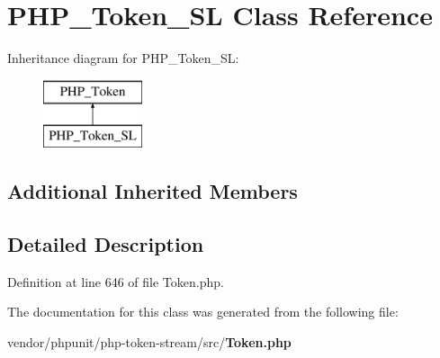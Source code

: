 \section{P\+H\+P\+\_\+\+Token\+\_\+\+S\+L Class Reference}
\label{class_p_h_p___token___s_l}
Inheritance diagram for P\+H\+P\+\_\+\+Token\+\_\+\+S\+L\+:\begin{figure}[H]
\begin{center}
\leavevmode
\includegraphics[height=2.000000cm]{class_p_h_p___token___s_l}
\end{center}
\end{figure}
\subsection*{Additional Inherited Members}


\subsection{Detailed Description}


Definition at line 646 of file Token.\+php.



The documentation for this class was generated from the following file\+:\begin{DoxyCompactItemize}
\item 
vendor/phpunit/php-\/token-\/stream/src/{\bf Token.\+php}\end{DoxyCompactItemize}
